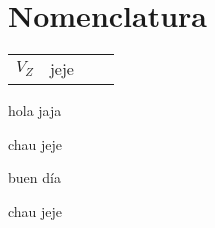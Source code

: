 \documentclass[11pt,a4paper]{article}
\begin{document}
	\pagestyle{pieyencabezado}
	\section*{Nomenclatura}
	
	\begin{tabular}{r l r l}
		$V_Z$ & jeje &&\\
	\end{tabular}
	\begin{multicols}{2}
		\begin{cajita}
			hola jaja
		\end{cajita}
		
		
		\begin{cajita}
			chau jeje
		\end{cajita}
	\end{multicols}

	\begin{cajita}
		buen día
	\end{cajita}

	\begin{multicols}{2}
		\begin{cajita}
			\begin{multicols}{2}
				
				
			\end{multicols}
			
		\end{cajita}
	
	
		\begin{cajita}
			chau jeje
		\end{cajita}
	\end{multicols}
\end{document}
